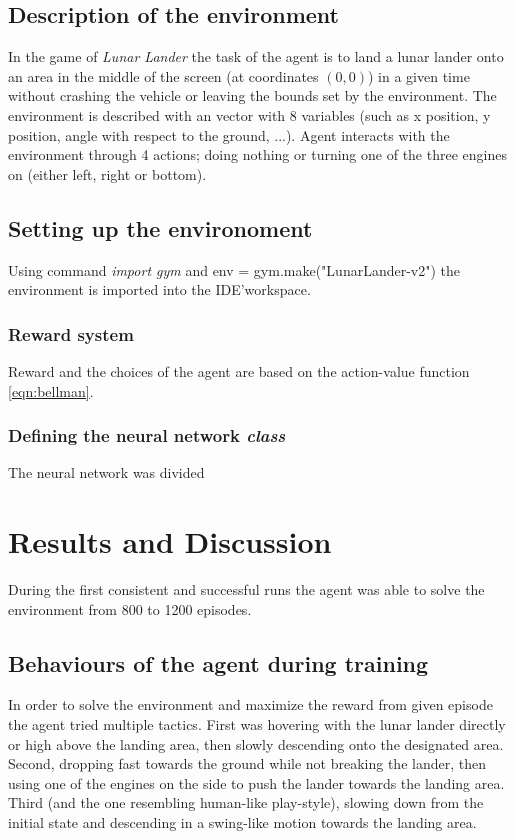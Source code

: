 \documentclass{article}
\begin{document}
\subsection{Description of the environment}
In the game of \textit{Lunar Lander} the task of the agent is to land a lunar lander onto an area in the middle of the screen (at coordinates $(0,0)$) in a given time without crashing the vehicle or leaving the bounds set by the environment. The environment is described with an vector with 8 variables (such as x position, y position, angle with respect to the ground, ...). Agent interacts with the environment through 4 actions; doing nothing or turning one of the three engines on (either left, right or bottom).

\subsection{Setting up the environoment}
Using command \textit{import gym} and env = gym.make("LunarLander-v2") the environment is imported into the IDE'\footnotemark \space workspace.

\subsubsection{Reward system}
Reward and the choices of the agent are based on the action-value function \ref{eqn:bellman}.

\subsubsection{Defining the neural network \textit{class}}
The neural network was divided

\newpage
\section*{Results and Discussion}
During the first consistent and successful runs the agent was able to solve the environment from 800 to 1200 episodes.

\subsection*{Behaviours of the agent during training}
In order to solve the environment and maximize the reward from given episode the agent tried multiple tactics. First was hovering with the lunar lander directly or high above the landing area, then slowly descending onto the designated area. Second, dropping fast towards the ground while not breaking the lander, then using one of the engines on the side to push the lander towards the landing area. Third (and the one resembling human-like play-style), slowing down from the initial state and descending in a swing-like motion towards the landing area.
\end{document}

